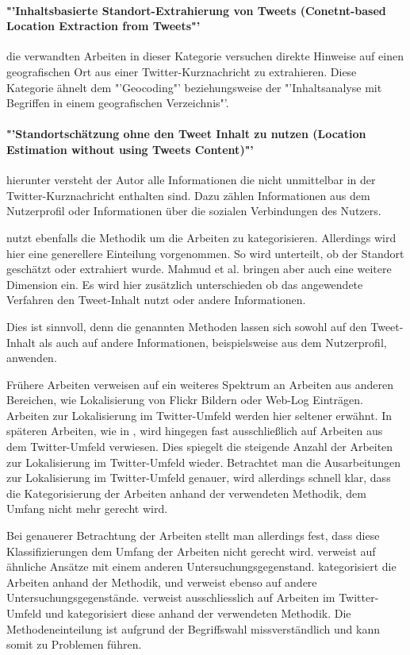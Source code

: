 		\paragraph*{"'Inhaltsbasierte Standort-Extrahierung von Tweets (Conetnt-based Location Extraction from Tweets"'} die verwandten Arbeiten in dieser Kategorie versuchen direkte Hinweise auf einen geografischen Ort aus einer Twitter-Kurznachricht zu extrahieren. 
		Diese Kategorie ähnelt dem "'Geocoding"' beziehungsweise der "'Inhaltsanalyse mit Begriffen in einem geografischen Verzeichnis"'. 

		\paragraph*{"'Standortschätzung ohne den Tweet Inhalt zu nutzen (Location Estimation without using Tweets Content)"'} hierunter versteht der Autor alle Informationen die nicht unmittelbar in der Twitter-Kurznachricht enthalten sind. Dazu zählen Informationen aus dem Nutzerprofil oder Informationen über die sozialen Verbindungen des Nutzers.


		\cite{Mahmud2012} nutzt ebenfalls die Methodik um die Arbeiten zu kategorisieren. 
		Allerdings wird hier eine generellere Einteilung vorgenommen. 
		So wird unterteilt, ob der Standort geschätzt oder extrahiert wurde.  
		Mahmud et al. bringen aber auch eine weitere Dimension ein. 
		Es wird hier zusätzlich unterschieden ob das angewendete Verfahren den Tweet-Inhalt nutzt oder andere Informationen. 

		Dies ist sinnvoll, denn die genannten Methoden lassen sich sowohl auf den Tweet-Inhalt als auch auf andere Informationen, beispielsweise aus dem Nutzerprofil, anwenden. 
		
		Frühere Arbeiten verweisen auf ein weiteres Spektrum an Arbeiten aus anderen Bereichen, wie Lokalisierung von Flickr Bildern oder Web-Log Einträgen.
		Arbeiten zur Lokalisierung im Twitter-Umfeld werden hier seltener erwähnt. 
		In späteren Arbeiten, wie in \cite{Priedhorsky2013}, wird hingegen fast ausschließlich auf Arbeiten aus dem Twitter-Umfeld verwiesen. 
		Dies spiegelt die steigende Anzahl der Arbeiten zur Lokalisierung im Twitter-Umfeld wieder.
		Betrachtet man die Ausarbeitungen zur Lokalisierung im Twitter-Umfeld genauer, wird allerdings schnell klar, dass die Kategorisierung der Arbeiten anhand der verwendeten Methodik, dem Umfang nicht mehr gerecht wird. 

		
		
		Bei genauerer Betrachtung der Arbeiten stellt man allerdings fest, dass diese Klassifizierungen dem Umfang der Arbeiten nicht gerecht wird. 
		\cite{Hecht2011} verweist auf ähnliche Ansätze mit einem anderen Untersuchungsgegenstand.
		\cite{Cheng2010} kategorisiert die Arbeiten anhand der Methodik, und verweist ebenso auf andere Untersuchungsgegenstände. 
		\cite{Priedhorsky2013} verweist ausschliesslich auf Arbeiten im Twitter-Umfeld und kategorisiert diese anhand der verwendeten Methodik. 
		Die Methodeneinteilung ist aufgrund der Begriffswahl missverständlich und kann somit zu Problemen führen. 

